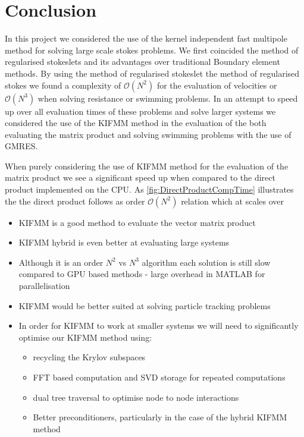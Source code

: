 \FloatBarrier
\section{Conclusion}
In this project we considered the use of the kernel independent fast multipole method for solving large scale stokes problems. We first coincided the method of regularised stokeslets and its advantages over traditional Boundary element methods. By using the method of regularised stokeslet the method of regularised stokes we found a complexity of $\mathcal{O}(N^2)$ for the evaluation of velocities or $\mathcal{O}(N^3)$ when solving resistance or swimming problems. In an attempt to speed up over all evaluation times of these problems and solve larger systems we considered the use of the KIFMM method in the evaluation of the both evaluating the matrix product and solving swimming problems with the use of GMRES. 

When purely considering the use of KIFMM method for the evaluation of the matrix product we see a significant speed up when compared to the direct product implemented on the CPU. As \cref{fig:DirectProductCompTime} illustrates the the direct product follows as order $\mathcal{O}(N^2)$ relation which at scales over 

\begin{itemize}
    \item KIFMM is a good method to evaluate the vector matrix product
    \item KIFMM hybrid is even better at evaluating large systems
    \item Although it is an order $N^2$ vs $N^3$ algorithm each solution is still slow compared to GPU based methods - large overhead in MATLAB for parallelisation 
    \item KIFMM would be better suited at solving particle tracking problems  \cite{Gallagher2020SimulationsMechanics}
    \item In order for KIFMM to work at smaller systems we will need to significantly optimise our KIFMM method using:
    \begin{itemize}
        \item recycling the Krylov subspaces \cite{Rostami2019FastBiofluids,Parks2006RecyclingSystems}
        \item FFT based computation and SVD storage for repeated computations \cite{Ying2004}
        \item dual tree traversal to optimise node to node interactions \cite{Wilson2021ATraversal}
        \item Better preconditioners, particularly in the case of the hybrid KIFMM method
    \end{itemize}
\end{itemize}